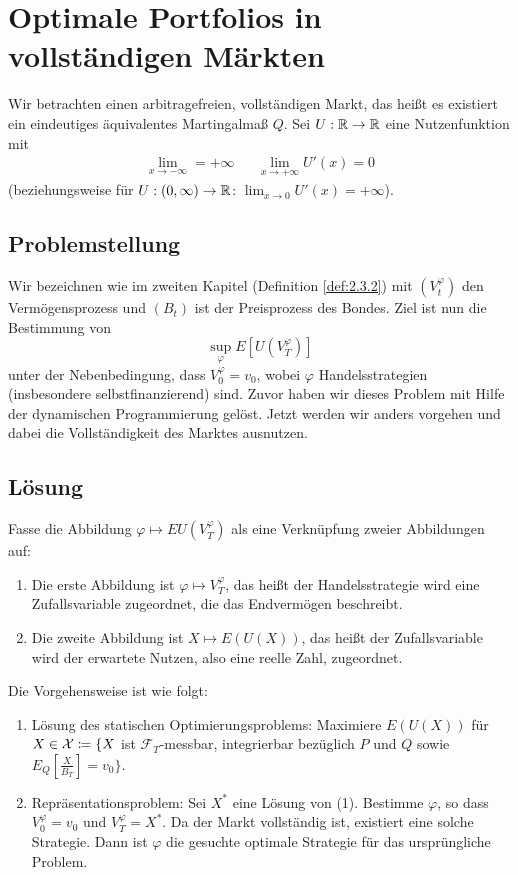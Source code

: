 \documentclass[a4paper,twoside,DIV15,BCOR12mm]{scrbook}
\newcommand{\cX}{\mathcal X}
\newcommand{\cF}{\mathcal F}
\begin{document}
\section{Optimale Portfolios in vollständigen Märkten}

Wir betrachten einen arbitragefreien, vollständigen Markt, das heißt es existiert ein eindeutiges äquivalentes Martingalmaß $Q$. Sei $U:\mathbb{R}\to\mathbb{R}$ eine Nutzenfunktion mit
\begin{align*}
\lim_{x\to-\infty} = + \infty && \lim_{x\to+\infty} U'(x) = 0
\end{align*}
(beziehungsweise für $U:(0,\infty)\to\mathbb{R}$: $\lim_{x\to0}U'(x) = +\infty$).

\subsection{Problemstellung}

Wir bezeichnen wie im zweiten Kapitel (Definition \ref{def:2.3.2}) mit 
$(V_t^\varphi)$ den Vermögensprozess und $(B_t)$ ist der Preisprozess des Bondes. Ziel ist nun die Bestimmung von
\[
\sup_{\varphi} E[U(V_T^\varphi)]
\]
unter der Nebenbedingung, dass $V_0^\varphi=v_0$, wobei $\varphi$ Handelsstrategien (insbesondere selbstfinanzierend) sind. Zuvor haben wir dieses Problem mit Hilfe der dynamischen Programmierung gelöst. Jetzt werden wir anders vorgehen und dabei die Vollständigkeit des Marktes ausnutzen.

\subsection{Lösung}

Fasse die Abbildung  $\varphi \mapsto EU(V_T^\varphi)$ als eine Verknüpfung zweier Abbildungen auf:
\begin{enumerate}
\item Die erste Abbildung ist $\varphi \mapsto V_T^\varphi$, das heißt der Handelsstrategie wird eine Zufallsvariable zugeordnet, die das Endvermögen beschreibt.
\item Die zweite Abbildung ist $X\mapsto E(U(X))$, das heißt der Zufallsvariable wird der erwartete Nutzen, also eine reelle Zahl, zugeordnet.
\end{enumerate}

Die Vorgehensweise ist wie folgt:
\begin{enumerate}
\item Lösung des statischen Optimierungsproblems: Maximiere $E(U(X))$ für $X\in\cX \da \{X$ ist $\cF_T$-messbar, integrierbar bezüglich $P$ und $Q$ sowie $E_Q[\frac{X}{B_T}] = v_0\}$.
\item Repräsentationsproblem: Sei $X^*$ eine Lösung von (1). Bestimme $\varphi$, so dass $V_0^\varphi = v_0$ und $V_T^\varphi = X^*$. Da der Markt vollständig ist, existiert eine solche Strategie. Dann ist $\varphi$ die gesuchte optimale Strategie für das ursprüngliche Problem.
\end{enumerate}
\end{document}
